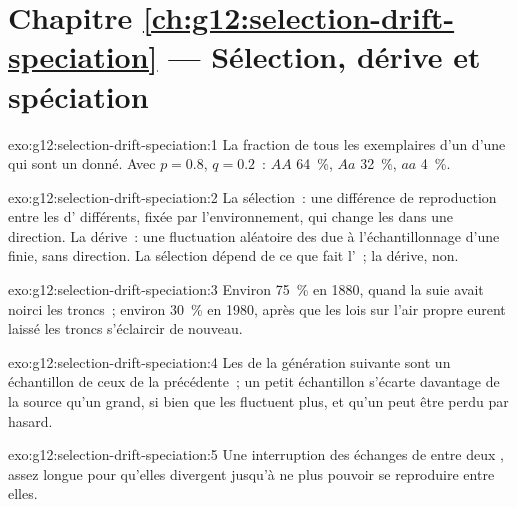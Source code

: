 \section*{Chapitre \ref{ch:g12:selection-drift-speciation} --- Sélection, dérive et spéciation}

\begin{solution}{exo:g12:selection-drift-speciation:1}
La fraction de tous les exemplaires d'un  d'une  qui sont
un  donné. Avec $p = 0.8$, $q = 0.2$~: $AA$ 64~\%, $Aa$ 32~\%,
$aa$ 4~\%.
\end{solution}

\begin{solution}{exo:g12:selection-drift-speciation:2}
La sélection~: une différence de reproduction entre les
 d' différents, fixée par l'environnement, qui change les  dans
une direction. La dérive~: une fluctuation aléatoire des  due
à l'échantillonnage d'une  finie, sans direction. La
sélection dépend de ce que fait l'~; la dérive, non.
\end{solution}

\begin{solution}{exo:g12:selection-drift-speciation:3}
Environ 75~\% en 1880, quand la suie avait noirci les troncs~; environ
30~\% en 1980, après que les lois sur l'air propre eurent laissé les
troncs s'éclaircir de nouveau.
\end{solution}

\begin{solution}{exo:g12:selection-drift-speciation:4}
Les  de la génération suivante sont un échantillon de ceux de la
précédente~; un petit échantillon s'écarte davantage de la source qu'un
grand, si bien que les  fluctuent plus, et qu'un  peut
être perdu par hasard.
\end{solution}

\begin{solution}{exo:g12:selection-drift-speciation:5}
Une interruption des échanges de  entre deux , assez
longue pour qu'elles divergent jusqu'à ne plus pouvoir se reproduire
entre elles.
\end{solution}

